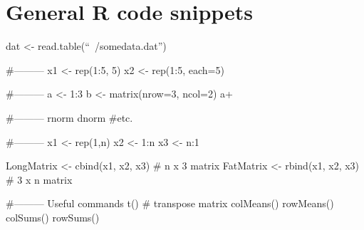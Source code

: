 \section{General R code snippets}
\begin{code}
 dat <- read.table(``~/somedata.dat'')
 
 #---------
 x1 <- rep(1:5, 5)
 x2 <- rep(1:5, each=5)

 #---------
 a <- 1:3
 b <- matrix(nrow=3, ncol=2)
 a+
 
 #---------
 rnorm
 dnorm
 #etc.

 #---------
 x1 <- rep(1,n)
 x2 <- 1:n
 x3 <- n:1
 
 LongMatrix <- cbind(x1, x2, x3) # n x 3 matrix
 FatMatrix  <- rbind(x1, x2, x3) # 3 x n matrix
 
 #--------- Useful commands
 t() # transpose matrix
 colMeans()
 rowMeans()
 colSums()
 rowSums()
 \end{code}

